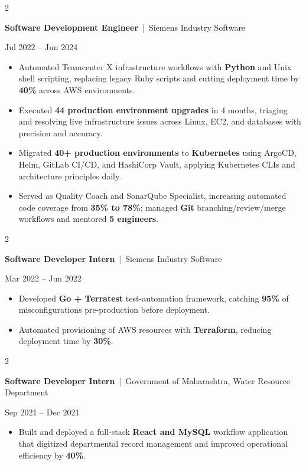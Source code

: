 \documentclass[10pt, letterpaper]{article}
\newenvironment{highlights}{
    \begin{itemize}[
        topsep=0.10 cm,
        parsep=0.06 cm,
        partopsep=0pt,
        itemsep=0.06 cm,
        leftmargin=12pt
    ]
}{
    \end{itemize}
}
\newenvironment{twocolentry}[2][]{
    \onecolentry
    \def\secondColumn{#2}
    \setcolumnwidth{\fill, 4.5 cm}
    \begin{paracol}{2}
}{
    \switchcolumn \raggedleft \secondColumn
    \end{paracol}
    \endonecolentry
}
\begin{document}
\vspace{0.15 cm}

\begin{twocolentry}{Jul 2022 -- Jun 2024}
\textbf{Software Development Engineer} \,|\, Siemens Industry Software
\end{twocolentry}
\begin{highlights}
  \item Automated Teamcenter X infrastructure workflows with \textbf{Python} and Unix shell scripting, replacing legacy Ruby scripts and cutting deployment time by \textbf{40\%} across AWS environments.
  \item Executed \textbf{44 production environment upgrades} in 4 months, triaging and resolving live infrastructure issues across Linux, EC2, and databases with precision and accuracy.
  \item Migrated \textbf{40+ production environments} to \textbf{Kubernetes} using ArgoCD, Helm, GitLab CI/CD, and HashiCorp Vault, applying Kubernetes CLIs and architecture principles daily.
  \item Served as Quality Coach and SonarQube Specialist, increasing automated code coverage from \textbf{35\% to 78\%}; managed \textbf{Git} branching/review/merge workflows and mentored \textbf{5 engineers}.
\end{highlights}

\vspace{0.15 cm}

\begin{twocolentry}{Mar 2022 -- Jun 2022}
\textbf{Software Developer Intern} \,|\, Siemens Industry Software
\end{twocolentry}
\begin{highlights}
  \item Developed \textbf{Go + Terratest} test-automation framework, catching \textbf{95\%} of misconfigurations pre-production before deployment.
  \item Automated provisioning of AWS resources with \textbf{Terraform}, reducing deployment time by \textbf{30\%}.
\end{highlights}

\vspace{0.15 cm}

\begin{twocolentry}{Sep 2021 -- Dec 2021}
\textbf{Software Developer Intern} \,|\, Government of Maharashtra, Water Resource Department
\end{twocolentry}
\begin{highlights}
  \item Built and deployed a full-stack \textbf{React and MySQL} workflow application that digitized departmental record management and improved operational efficiency by \textbf{40\%}.
\end{highlights}
\end{document}

